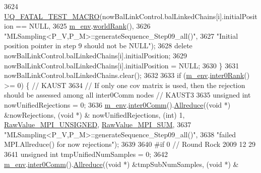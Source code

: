 \begin{DoxyCode}
3624           \hyperlink{_defines_8h_a56d63d18d0a6d45757de47fcc06f574d}{UQ\_FATAL\_TEST\_MACRO}(nowBalLinkControl.balLinkedChains[i].initialPosition == 
      NULL,
3625                               \hyperlink{class_q_u_e_s_o_1_1_m_l_sampling_a13f1ca4fe9f94822fe572a743eaced1d}{m\_env}.\hyperlink{class_q_u_e_s_o_1_1_base_environment_a78b57112bbd0e6dd0e8afec00b40ffa7}{worldRank}(),
3626                               \textcolor{stringliteral}{"MLSampling<P\_V,P\_M>::generateSequence\_Step09\_all()"},
3627                               \textcolor{stringliteral}{"Initial position pointer in step 9 should not be NULL"});
3628           \textcolor{keyword}{delete} nowBalLinkControl.balLinkedChains[i].initialPosition;
3629           nowBalLinkControl.balLinkedChains[i].initialPosition = NULL;
3630         \}
3631         nowBalLinkControl.balLinkedChains.clear();
3632 
3633         \textcolor{keywordflow}{if} (\hyperlink{class_q_u_e_s_o_1_1_m_l_sampling_a13f1ca4fe9f94822fe572a743eaced1d}{m\_env}.\hyperlink{class_q_u_e_s_o_1_1_base_environment_ae106b5bb8a80b655b88b3a26b1e7c185}{inter0Rank}() >= 0) \{ \textcolor{comment}{// KAUST}
3634           \textcolor{comment}{// If only one cov matrix is used, then the rejection should be assessed among all inter0Comm
       nodes // KAUST3}
3635           \textcolor{keywordtype}{unsigned} \textcolor{keywordtype}{int} nowUnifiedRejections = 0;
3636           \hyperlink{class_q_u_e_s_o_1_1_m_l_sampling_a13f1ca4fe9f94822fe572a743eaced1d}{m\_env}.\hyperlink{class_q_u_e_s_o_1_1_base_environment_a689e4d140c74d495d97eb498714a4b82}{inter0Comm}().\hyperlink{class_q_u_e_s_o_1_1_mpi_comm_a72e137e60ef8060efb1ee5fc874fa4b8}{Allreduce}((\textcolor{keywordtype}{void} *) &nowRejections, (\textcolor{keywordtype}{void} *) &
      nowUnifiedRejections, (\textcolor{keywordtype}{int}) 1, \hyperlink{_mpi_comm_8h_a06cbfbc33436f6e0dc8a48ff3c49bdfc}{RawValue\_MPI\_UNSIGNED}, 
      \hyperlink{_mpi_comm_8h_afbf78d291c032aa7f512bc566cee2bd1}{RawValue\_MPI\_SUM},
3637                                        \textcolor{stringliteral}{"MLSampling<P\_V,P\_M>::generateSequence\_Step09\_all()"},
3638                                        \textcolor{stringliteral}{"failed MPI.Allreduce() for now rejections"});
3639 
3640 \textcolor{preprocessor}{#if 0 // Round Rock 2009 12 29}
3641 \textcolor{preprocessor}{}          \textcolor{keywordtype}{unsigned} \textcolor{keywordtype}{int} tmpUnifiedNumSamples = 0;
3642           \hyperlink{class_q_u_e_s_o_1_1_m_l_sampling_a13f1ca4fe9f94822fe572a743eaced1d}{m\_env}.\hyperlink{class_q_u_e_s_o_1_1_base_environment_a689e4d140c74d495d97eb498714a4b82}{inter0Comm}().\hyperlink{class_q_u_e_s_o_1_1_mpi_comm_a72e137e60ef8060efb1ee5fc874fa4b8}{Allreduce}((\textcolor{keywordtype}{void} *) &tmpSubNumSamples, (\textcolor{keywordtype}{void} *) &

\end{DoxyCode}
